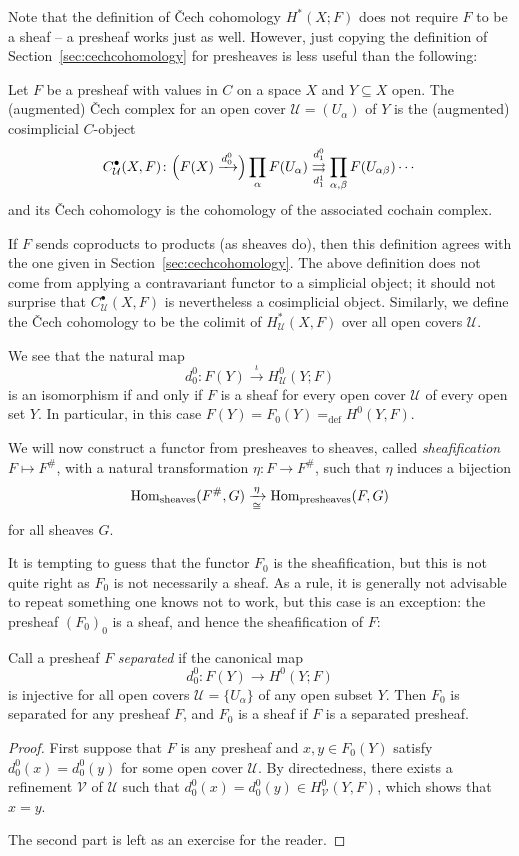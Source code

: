 \documentclass[a4paper,openany]{scrbook}
\begin{document}
Note that the definition of \v Cech cohomology $H^*(X;F)$ does not require $F$ to be a sheaf -- a presheaf works just as well. However, just copying the definition of Section~\ref{sec:cechcohomology} for presheaves is less useful than the following:
\begin{defn}
Let $F$ be a presheaf with values in $C$ on a space $X$ and $Y \subseteq X$ open. The (augmented) \v Cech complex for an open cover $\mathcal U=(U_\alpha)$ of $Y$ is the (augmented) cosimplicial $C$-object
\[
C^\bullet_{\mathcal U}(X,F)\colon \Bigl( F(X) \xrightarrow{d_0^0} \Bigr) \prod_{\alpha} F(U_\alpha) \overset{d^0_1}{\underset{d^1_1}{\rightrightarrows}} \prod_{\alpha,\beta} F(U_{\alpha\beta}) \cdots
\]
and its \v Cech cohomology is the cohomology of the associated cochain complex.
\end{defn}
If $F$ sends coproducts to products (as sheaves do), then this definition agrees with the one given in Section~\ref{sec:cechcohomology}. The above definition does not come from applying a contravariant functor to a simplicial object; it should  not surprise that $C^\bullet_{\mathcal U}(X,F)$ is nevertheless a cosimplicial object. Similarly, we define the \v Cech cohomology to be the colimit of $H^*_{\mathcal U}(X,F)$ over all open covers $\mathcal U$.

We see that the natural map
\[
d_0^0\colon F(Y) \xrightarrow{\iota} H^0_{\mathcal U}(Y;F)
\]
is an isomorphism if and only if $F$ is a sheaf for every open cover $\mathcal U$ of every open set $Y$. In particular, in this case $F(Y) = F_0(Y) =_{\operatorname{def}} H^0(Y,F)$.

We will now construct a functor from presheaves to sheaves, called \emph{sheafification} $F \mapsto F^\#$, with a natural transformation $\eta\colon F \to F^\#$, such that $\eta$ induces a bijection
\[
\operatorname{Hom}_{\text{sheaves}}(F^\#,G) \xrightarrow[\cong]{\eta} \operatorname{Hom}_{\text{presheaves}}(F,G)
\]
for all sheaves $G$.

It is tempting to guess that the functor $F_0$ is the sheafification, but this is not quite right as $F_0$ is not necessarily a sheaf. As a rule, it is generally not advisable to repeat something one knows not to work, but this case is an exception: the presheaf $(F_0)_0$ is a sheaf, and hence the sheafification of $F$:

\begin{thm}\label{thm:sheafification}
Call a presheaf $F$ \emph{separated} if the canonical map
\[
d_0^0\colon F(Y) \to H^0(Y;F)
\]
is injective for all open covers $\mathcal U=\{U_\alpha\}$ of any open subset $Y$. Then $F_0$ is separated for any presheaf $F$, and $F_0$ is a sheaf if $F$ is a separated presheaf.
\end{thm}
\begin{proof}
First suppose that $F$ is any presheaf and $x,y \in F_0(Y)$ satisfy $d_0^0(x)=d_0^0(y)$ for some open cover $\mathcal U$. By directedness, there exists a refinement $\mathcal V$ of $\mathcal U$ such that $d_0^0(x)=d_0^0(y) \in H^0_{\mathcal V}(Y,F)$, which shows that $x=y$.

The second part is left as an exercise for the reader.
\end{proof}
\end{document}
